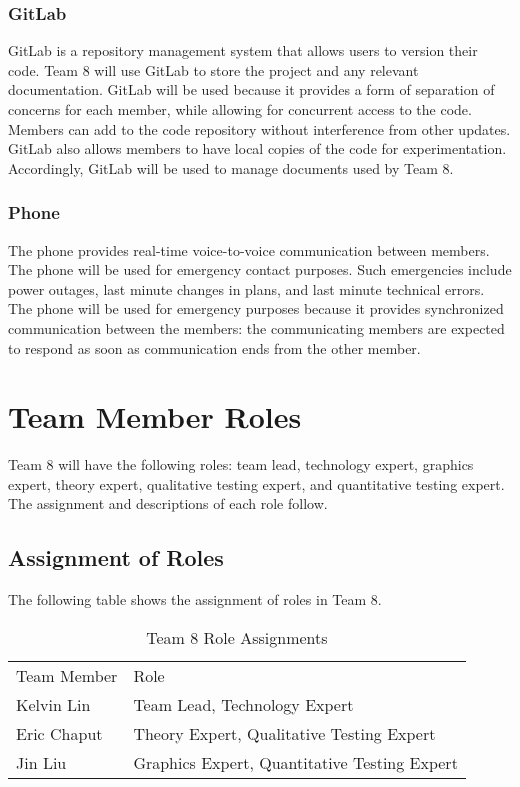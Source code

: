 \documentclass{article}
\begin{document}
\subsubsection{GitLab}
GitLab is a repository management system that allows users to version their code. Team 8 will use GitLab to store the project and any relevant documentation. GitLab will be used because it provides a form of separation of concerns for each member, while allowing for concurrent access to the code. Members can add to the code repository without interference from other updates. GitLab also allows members to have local copies of the code for experimentation. Accordingly, GitLab will be used to manage documents used by Team 8.

\subsubsection{Phone}
The phone provides real-time voice-to-voice communication between members. The phone will be used for emergency contact purposes. Such emergencies include power outages, last minute changes in plans, and last minute technical errors. The phone will be used for emergency purposes because it provides synchronized communication between the members: the communicating members are expected to respond as soon as communication ends from the other member.

\section{Team Member Roles}
Team 8 will have the following roles: team lead, technology expert, graphics 
expert, theory expert, qualitative testing expert, and quantitative testing 
expert. The assignment and descriptions of each role follow.

\subsection{Assignment of Roles}
The following table shows the assignment of roles in Team 8.

\begin{table}[h!]
	\begin{tabular}{ll}
		Team Member & Role                                        \\
		Kelvin Lin  & Team Lead, Technology Expert                \\
		Eric Chaput & Theory Expert, Qualitative Testing Expert  \\
		Jin Liu     & Graphics Expert, Quantitative Testing Expert
	\end{tabular}

	\caption{Team 8 Role Assignments}
\end{table}
\end{document}
